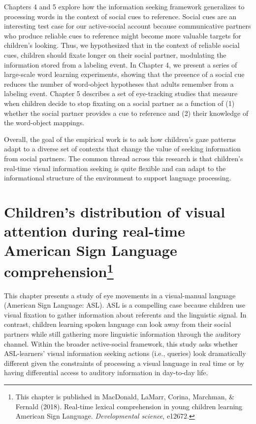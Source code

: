 \documentclass[oneside]{report}
\begin{document}
Chapters 4 and 5 explore how the information seeking framework
generalizes to processing words in the context of social cues to
reference. Social cues are an interesting test case for our
active-social account because communicative partners who produce
reliable cues to reference might become more valuable targets for
children's looking. Thus, we hypothesized that in the context of
reliable social cues, children should fixate longer on their social
partner, modulating the information stored from a labeling event. In
Chapter 4, we present a series of large-scale word learning experiments,
showing that the presence of a social cue reduces the number of
word-object hypotheses that adults remember from a labeling event.
Chapter 5 describes a set of eye-tracking studies that measure when
children decide to stop fixating on a social partner as a function of
(1) whether the social partner provides a cue to reference and (2) their
knowledge of the word-object mappings.

Overall, the goal of the empirical work is to ask how children's gaze
patterns adapt to a diverse set of contexts that change the value of
seeking information from social partners. The common thread across this
research is that children's real-time visual information seeking is
quite flexible and can adapt to the informational structure of the
environment to support language processing.

\chapter[Children's distribution of visual attention during real-time
American Sign Language comprehension]{\texorpdfstring{Children's
distribution of visual attention during real-time American Sign Language
comprehension\footnote{This chapter is published in MacDonald, LaMarr,
  Corina, Marchman, \& Fernald (2018). Real-time lexical comprehension
  in young children learning American Sign Language. \emph{Developmental
  science}, e12672.}}{Children's distribution of visual attention during real-time American Sign Language comprehension}}\label{childrens-distribution-of-visual-attention-during-real-time-american-sign-language-comprehension}


This chapter presents a study of eye movements in a visual-manual
language (American Sign Language: ASL). ASL is a compelling case because
children use visual fixation to gather information about referents and
the linguistic signal. In contrast, children learning spoken language
can look away from their social partners while still gathering more
linguistic information through the auditory channel. Within the broader
active-social framework, this study asks whether ASL-learners' visual
information seeking actions (i.e., queries) look dramatically different
given the constraints of processing a visual language in real time or by
having differential access to auditory information in day-to-day life.
\end{document}
